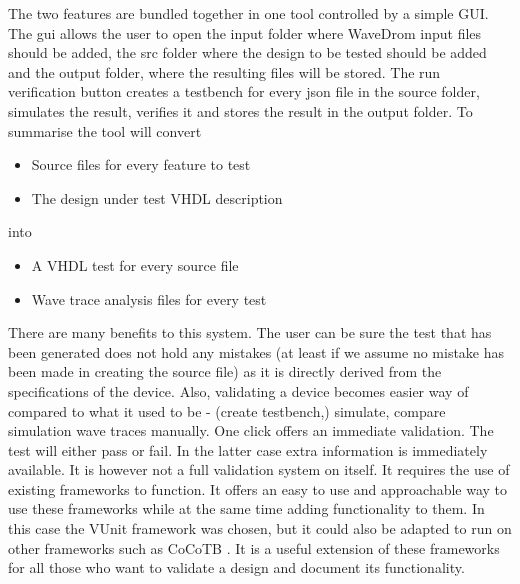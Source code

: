 The two features are bundled together in one tool controlled by a simple GUI.\nline
{}\nline
The gui allows the user to open the input folder where WaveDrom input files should be added, the src folder where the design to be tested should be added and the output folder, where the resulting files will be stored. The run verification button creates a testbench for every json file in the source folder, simulates the result, verifies it and stores the result in the output folder.
\npar
To summarise the tool will convert
\begin{itemize}
	\item Source files for every feature to test
	\item The design under test VHDL description
\end{itemize}
into
\begin{itemize}
	\item A VHDL test for every source file
	\item Wave trace analysis files for every test
\end{itemize}
There are many benefits to this system. The user can be sure the test that has been generated does not hold any mistakes (at least if we assume no mistake has been made in creating the source file) as it is directly derived from the specifications of the device. Also, validating a device becomes easier way of compared to what it used to be - (create testbench,) simulate, compare simulation wave traces manually. One click offers an immediate validation. The test will either pass or fail. In the latter case extra information is immediately available.
\npar
It is however not a full validation system on itself. It requires the use of existing frameworks to function. It offers an easy to use and approachable way to use these frameworks while at the same time adding functionality to them. In this case the VUnit framework was chosen, but it could also be adapted to run on other frameworks such as CoCoTB \cite{cocotb}. It is a useful extension of these frameworks for all those who want to validate a design and document its functionality. 

